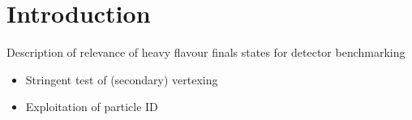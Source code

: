 \documentclass[preprint]{elsarticle}
\newcommand{\ecal}{Si-W ECAL}
\newcommand{\ecalp}{\ecal\ physics prototype}
\newenvironment{bottompar}{\par\vspace*{\fill}}{\clearpage}
\begin{document}







\tableofcontents



\section{Introduction}

Description of relevance of heavy flavour finals states for detector benchmarking

\begin{itemize}
\item Stringent test of (secondary) vertexing
\item Exploitation of particle ID
\end{itemize}


\end{document}

